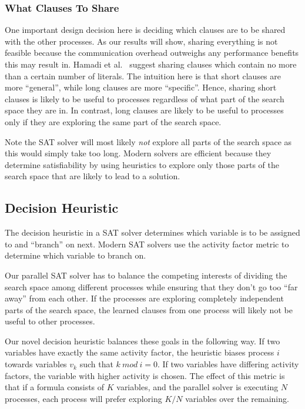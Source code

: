 \documentclass[letterpaper, compsoc, conference]{IEEEtran}
\begin{document}
\subsubsection{What Clauses To Share}

One important design decision here is deciding which clauses are to be shared
with the other processes. As our results will show, sharing everything is not
feasible because the communication overhead outweighs any performance benefits
this may result in. Hamadi et al.~\cite{Hamadi} suggest sharing clauses which
contain no more than a certain number of literals. The intuition here is that
short clauses are more ``general'', while long clauses are more ``specific''.
Hence, sharing short clauses is likely to be useful to processes regardless of
what part of the search space they are in. In contrast, long clauses are likely
to be useful to processes only if they are exploring the same part of the
search space. 

Note the SAT solver will most likely \textit{not} explore all parts of the
search space as this would simply take too long. Modern solvers are efficient
because they determine satisfiability by using heuristics to explore only
those parts of the search space that are likely to lead to a solution.

\subsection{Decision Heuristic} 
\label{sec:decheu}

The decision heuristic in a SAT solver determines which variable is to be
assigned to and ``branch'' on next. Modern SAT solvers use the activity factor
metric to determine which variable to branch on.

Our parallel SAT solver has to balance the competing interests of dividing the
search space among different processes while ensuring that they don't go too
``far away'' from each other. If the processes are exploring completely
independent parts of the search space, the learned clauses from one process
will likely not be useful to other processes. 

Our novel decision heuristic balances these goals in the following way.  If
two variables have exactly the same activity factor, the heuristic biases
process $i$ towards variables $v_k$ such that $k~mod~i=0$. If two variables
have differing activity factors, the variable with higher activity is chosen.
The effect of this metric is that if a formula consists of $K$ variables,
and the parallel solver is executing $N$ processes, each process will prefer
exploring $K/N$ variables over the remaining. 
\end{document}
